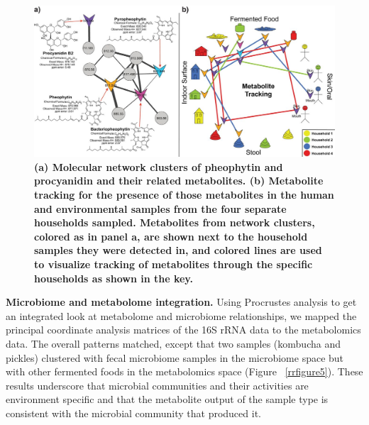 \begin{figure}[htbp]
\includegraphics[width=\columnwidth]{chapter_48_hours_figures/F4.jpg}
\caption[(a) Molecular network clusters of pheophytin and procyanidin and their related metabolites. (b) Metabolite tracking for the presence of those metabolites in the human and environmental samples from the four separate households sampled. Metabolites from network clusters, colored as in panel a, are shown next to the household samples they were detected in, and colored lines are used to visualize tracking of metabolites through the specific households as shown in the key]{\textbf{(a) Molecular network clusters of pheophytin and procyanidin and their related metabolites. (b) Metabolite tracking for the presence of those metabolites in the human and environmental samples from the four separate households sampled. Metabolites from network clusters, colored as in panel a, are shown next to the household samples they were detected in, and colored lines are used to visualize tracking of metabolites through the specific households as shown in the key.}}
\label{rrfigure4}
\end{figure}

\textbf{Microbiome and metabolome integration.} Using Procrustes analysis \cite{Vazquez-Baeza2013}
to get an integrated look at metabolome and microbiome relationships, we mapped the
principal coordinate analysis matrices of the 16S rRNA data to the metabolomics
data. The overall patterns matched, except that two samples (kombucha and pickles)
clustered with fecal microbiome samples in the microbiome space but with other
fermented foods in the metabolomics space (Figure ~\ref{rrfigure5}). These
results underscore that microbial communities and their activities are environment
specific and that the metabolite output of the sample type is consistent with the
microbial community that produced it.

